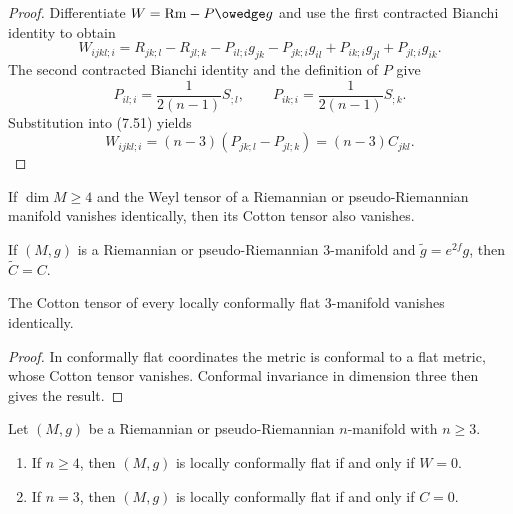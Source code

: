 \begin{proof}
\sketch
Differentiate $W=\mathrm{Rm}-P\owedge g$ and use the first contracted Bianchi
identity to obtain
\begin{equation}
W_{ijkl;i}=R_{jk;l}-R_{jl;k}-P_{il;i}g_{jk}-P_{jk;i}g_{il}
+P_{ik;i}g_{jl}+P_{jl;i}g_{ik}. \tag{7.51}
\end{equation}
The second contracted Bianchi identity and the definition of $P$ give
\[
P_{il;i}=\frac1{2(n-1)}S_{;l},
\qquad
P_{ik;i}=\frac1{2(n-1)}S_{;k}.
\]
Substitution into (7.51) yields
\[
W_{ijkl;i}=(n-3)(P_{jk;l}-P_{jl;k})=(n-3)C_{jkl}.
\]
\end{proof}

\begin{corollary}
\label{cor:weyl-cotton-vanish-dimension-4}

If $\dim M\geq4$ and the Weyl tensor of a Riemannian or pseudo-Riemannian
manifold vanishes identically, then its Cotton tensor also vanishes.
\end{corollary}

\begin{proposition}
\label{prop:conformal-invariance-cotton-dim3}
If $(M,g)$ is a Riemannian or pseudo-Riemannian $3$-manifold and
$\widetilde g=e^{2f}g$, then $\widetilde C=C$.
\end{proposition}

\begin{corollary}
\label{cor:cotton-tensor-vanishes-conformally-flat}

The Cotton tensor of every locally conformally flat $3$-manifold vanishes
identically.
\end{corollary}
\begin{proof}
\sketch
In conformally flat coordinates the metric is conformal to a flat metric,
whose Cotton tensor vanishes. Conformal invariance in dimension three then
gives the result.
\end{proof}

\begin{theorem}
\label{thm:weyl-schouten}

Let $(M,g)$ be a Riemannian or pseudo-Riemannian $n$-manifold with $n\geq3$.
\begin{enumerate}
\item[(a)] If $n\geq4$, then $(M,g)$ is locally conformally flat if and only
if $W=0$.
\item[(b)] If $n=3$, then $(M,g)$ is locally conformally flat if and only if
$C=0$.
\end{enumerate}
\end{theorem}

